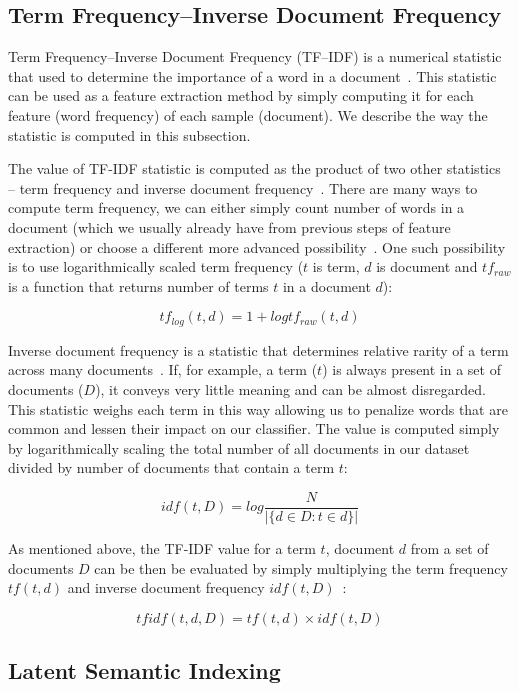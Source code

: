 \subsection{Term Frequency--Inverse Document Frequency}

Term Frequency--Inverse Document Frequency (TF--IDF) is a numerical statistic that used to determine the importance of a word in a document~\cite{tfidf2014}. This statistic can be used as a feature extraction method by simply computing it for each feature (word frequency) of each sample (document). We describe the way the statistic is computed in this subsection.

The value of TF-IDF statistic is computed as the product of two other statistics -- term frequency and inverse document frequency~\cite{tfidf2014}. There are many ways to compute term frequency, we can either simply count number of words in a document (which we usually already have from previous steps of feature extraction) or choose a different more advanced possibility~\cite{manning2008introduction}. One such possibility is to use logarithmically scaled term frequency ($t$ is term, $d$ is document and $tf_{raw}$ is a function that returns number of terms $t$ in a document $d$):

$$tf_{log}(t,d) = 1 + log tf_{raw}(t,d)$$

Inverse document frequency is a statistic that determines relative rarity of a term across many documents~\cite{tfidf2014}. If, for example, a term ($t$) is always present in a set of documents ($D$), it conveys very little meaning and can be almost disregarded. This statistic weighs each term in this way allowing us to penalize words that are common and lessen their impact on our classifier. The value is computed simply by logarithmically scaling the total number of all documents in our dataset divided by number of documents that contain a term $t$:

$$idf(t, D) = log \frac{N}{|\{d \in D : t \in d\}|}$$

As mentioned above, the TF-IDF value for a term $t$, document $d$ from a set of documents $D$ can be then be evaluated by simply multiplying the term frequency $tf(t,d)$ and inverse document frequency $idf(t,D)$~\cite{manning2008introduction}:

$$tfidf(t,d,D) = tf(t,d) \times idf(t,D)$$

\subsection{Latent Semantic Indexing}

